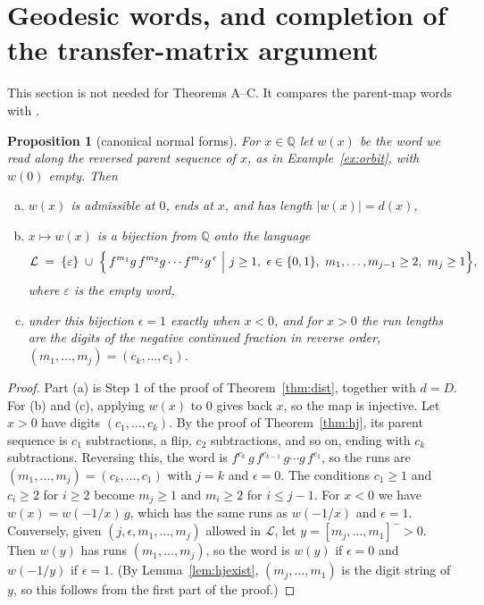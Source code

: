 \documentclass[11pt]{article}
\newtheorem{proposition}[theorem]{Proposition}
\theoremstyle{definition}
\theoremstyle{remark}
\newcommand{\Q}{\mathbb{Q}}
\newcommand{\hj}[1]{[#1]^{-}}                 %
\newcommand{\lang}{\mathcal{L}}
\begin{document}
\section{Geodesic words, and completion of the transfer-matrix argument}\label{sec:words}

This section is not needed for Theorems A--C. It compares the parent-map words with \cite{mmz}.

\begin{proposition}[canonical normal forms]\label{prop:normalform}
For $x\in\Q$ let $w(x)$ be the word we read along the reversed parent sequence of $x$, as in
Example~\ref{ex:orbit}, with $w(0)$ empty. Then
\begin{enumerate}[(a)]
\item $w(x)$ is admissible at $0$, ends at $x$, and has length $|w(x)|=d(x)$,
\item $x\mapsto w(x)$ is a bijection from $\Q$ onto the language
\[
\lang \;=\; \{\varepsilon\}\;\cup\;
\Bigl\{\,f^{m_1}g\,f^{m_2}g\cdots f^{m_j}g^{\,\epsilon}\ \Big|\ j\ge1,\ \epsilon\in\{0,1\},\
m_1,\dots,m_{j-1}\ge2,\ m_j\ge1\Bigr\},
\]
where $\varepsilon$ is the empty word,
\item under this bijection $\epsilon=1$ exactly when $x<0$, and for $x>0$ the run lengths are the
digits of the negative continued fraction in reverse order, $(m_1,\dots,m_j)=(c_k,\dots,c_1)$.
\end{enumerate}
\end{proposition}

\begin{proof}
Part (a) is Step 1 of the proof of Theorem~\ref{thm:dist}, together with $d=D$. For (b) and (c),
applying $w(x)$ to $0$ gives back $x$, so the map is injective. Let $x>0$ have digits
$(c_1,\dots,c_k)$. By the proof of Theorem~\ref{thm:hj}, its parent sequence is $c_1$ subtractions,
a flip, $c_2$ subtractions, and so on, ending with $c_k$ subtractions. Reversing this, the word is
$f^{c_k}\,g\,f^{c_{k-1}}\,g\cdots g\,f^{c_1}$, so the runs are $(m_1,\dots,m_j)=(c_k,\dots,c_1)$ with
$j=k$ and $\epsilon=0$. The conditions $c_1\ge1$ and $c_i\ge2$ for $i\ge2$ become $m_j\ge1$ and
$m_i\ge2$ for $i\le j-1$. For $x<0$ we have $w(x)=w(-1/x)\,g$, which has the same runs as
$w(-1/x)$ and $\epsilon=1$. Conversely, given $(j,\epsilon,m_1,\dots,m_j)$ allowed in $\lang$, let
$y=\hj{m_j,\dots,m_1}>0$. Then $w(y)$ has runs $(m_1,\dots,m_j)$, so the word is $w(y)$ if
$\epsilon=0$ and $w(-1/y)$ if $\epsilon=1$. (By Lemma~\ref{lem:hjexist}, $(m_j,\dots,m_1)$ is
the digit string of $y$, so this follows from the first part of the proof.)
\end{proof}
\end{document}

